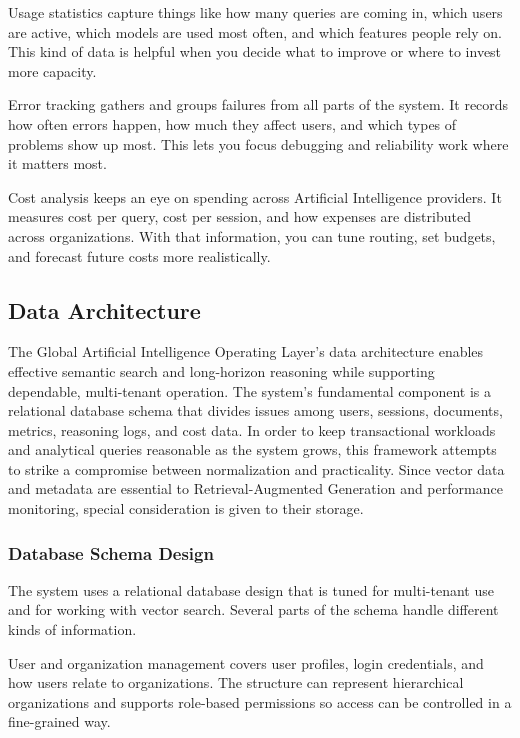 \documentclass[final,5p,times,twocolumn,authoryear,draft]{elsarticle}
\begin{document}
Usage statistics capture things like how many queries are coming in, which users are active, which models are used most often, and which features people rely on. This kind of data is helpful when you decide what to improve or where to invest more capacity.

Error tracking gathers and groups failures from all parts of the system. It records how often errors happen, how much they affect users, and which types of problems show up most. This lets you focus debugging and reliability work where it matters most.

Cost analysis keeps an eye on spending across Artificial Intelligence providers. It measures cost per query, cost per session, and how expenses are distributed across organizations. With that information, you can tune routing, set budgets, and forecast future costs more realistically.

\subsection{Data Architecture}

The Global Artificial Intelligence Operating Layer's data architecture enables effective semantic search and long-horizon reasoning while supporting dependable, multi-tenant operation. The system's fundamental component is a relational database schema that divides issues among users, sessions, documents, metrics, reasoning logs, and cost data. In order to keep transactional workloads and analytical queries reasonable as the system grows, this framework attempts to strike a compromise between normalization and practicality. Since vector data and metadata are essential to Retrieval-Augmented Generation and performance monitoring, special consideration is given to their storage.

\subsubsection{Database Schema Design}

The system uses a relational database design that is tuned for multi-tenant use and for working with vector search. Several parts of the schema handle different kinds of information.

User and organization management covers user profiles, login credentials, and how users relate to organizations. The structure can represent hierarchical organizations and supports role-based permissions so access can be controlled in a fine-grained way.
\end{document}
